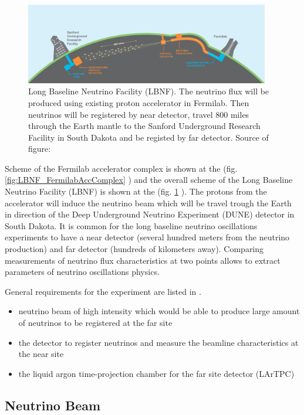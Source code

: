 \begin{figure}
\caption{Long Baseline Neutrino Facility (LBNF). The neutrino flux will be produced using existing proton accelerator in Fermilab. Then neutrinos will be registered by near detector, travel 800 miles through the Earth mantle to the Sanford Underground Research Facility in South Dakota and be registed by far detector. Source of figure: \cite{ref_LBNFweb} }
\label{fig:LBNF_overallScheme}
\centering
\includegraphics[width=0.95\textwidth, keepaspectratio=true]{figs/LBNF_overallScheme.png} 
\end{figure}

Scheme of the Fermilab accelerator complex is shown at the (fig. \ref{fig:LBNF_FermilabAccComplex} ) and the overall scheme of the 
Long Baseline Neutrino Facility (LBNF) is shown at the (fig. \ref{fig:LBNF_overallScheme} ). The protons from the accelerator  will induce the neutrino beam which will be travel trough the Earth in direction of the Deep Underground Neutrino Experiment (DUNE) detector in South Dakota. It is common for the long baseline neutrino oscillations experiments to have a near detector (several hundred meters from the neutrino production) and far detector (hundreds of kilometers away). Comparing measurements of neutrino flux characteristics at two points allows to extract parameters of neutrino oscillations physics.

General requirements for the experiment are listed in \cite{ref_LBNFdoc_volume-detectors}.
\begin{itemize}
  \item neutrino beam of high intensity which would be able to produce large amount of neutrinos to be registered at the far site
  \item the detector to register neutrinos and measure the beamline characteristics at the near site
  \item the liquid argon time-projection chamber for the far site detector (LArTPC)
\end{itemize}

\subsection{Neutrino Beam}

